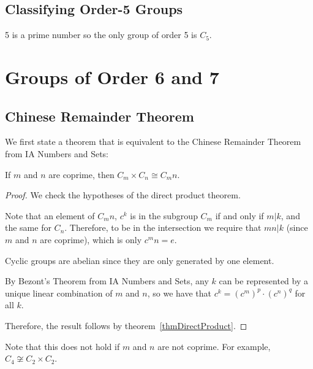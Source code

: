 \documentclass[../Main.tex]{subfiles}
\begin{document}
\subsection{Classifying Order-5 Groups}
5 is a prime number so the only group of order 5 is $C_5$.
\section{Groups of Order 6 and 7}
\subsection{Chinese Remainder Theorem}
We first state a theorem that is equivalent to the Chinese Remainder Theorem from IA Numbers and Sets:
\begin{theorem}
    If $m$ and $n$ are coprime, then $C_m \times C_n \cong C_mn$.
    \label{thmChineseRemainder}
\end{theorem}
\begin{proof}
    We check the hypotheses of the direct product theorem.\par
    Note that an element of $C_mn$, $c^k$ is in the subgroup $C_m$ if and only if $m | k$, and the same for $C_n$. Therefore, to be in the intersection we require that $mn | k$ (since $m$ and $n$ are coprime), which is only $c^mn = e$.\par
    Cyclic groups are abelian since they are only generated by one element.\par
    By Bezont's Theorem from IA Numbers and Sets, any $k$ can be represented by a unique linear combination of $m$ and $n$, so we have that $c^k = \left(c^m\right)^p \cdot \left(c^n\right)^q$ for all $k$.\par
    Therefore, the result follows by theorem~\ref{thmDirectProduct}.
\end{proof}
\begin{remark}
    Note that this does not hold if $m$ and $n$ are not coprime. For example, $C_4 \not\cong C_2 \times C_2$.
\end{remark}
\end{document}
